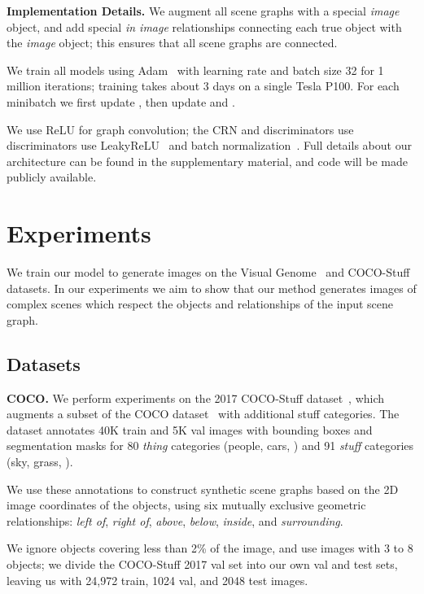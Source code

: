 \documentclass[10pt,twocolumn,letterpaper]{article}
\begin{document}
\textbf{Implementation Details.}
We augment all scene graphs with a special \emph{image} object, and add
special \emph{in image} relationships connecting each true object with the
\emph{image} object; this ensures that all scene graphs are connected.

We train all models using Adam~\cite{kingma2015adam} with learning rate
 and batch size 32 for 1 million iterations; training
takes about 3 days on a single Tesla P100.
For each minibatch we first update , then update  and .

We use ReLU for graph convolution; the CRN and discriminators use 
discriminators use LeakyReLU~\cite{maas2013rectifier} and batch
normalization~\cite{ioffe2015batch}. Full details about our architecture can
be found in the supplementary material, and code will be made publicly available.

 

\section{Experiments}
We train our model to generate  images on the Visual Genome~\cite{krishna2017visual} and COCO-Stuff~\cite{caesar2016coco} datasets. In our experiments
we aim to show that our method generates images of complex scenes which respect
the objects and relationships of the input scene graph.

\subsection{Datasets}

\textbf{COCO.}
We perform experiments on the 2017 COCO-Stuff dataset~\cite{caesar2016coco},
which augments a subset of the COCO dataset~\cite{lin2014microsoft} with
additional stuff categories.  The dataset annotates 40K train and 5K val images
with bounding boxes and segmentation masks for 80 \emph{thing} categories
(people, cars, \etc) and 91 \emph{stuff} categories (sky, grass, \etc).

We use these annotations to construct synthetic scene graphs based on the 2D
image coordinates of the objects, using six mutually exclusive geometric
relationships: \emph{left of}, \emph{right of}, \emph{above}, \emph{below},
\emph{inside}, and \emph{surrounding}.

We ignore objects covering less than 2\% of the image, and use images with 3 to
8 objects; we divide the COCO-Stuff 2017 val set into our own val and test sets,
leaving us with 24,972 train, 1024 val, and 2048 test images.
\end{document}

